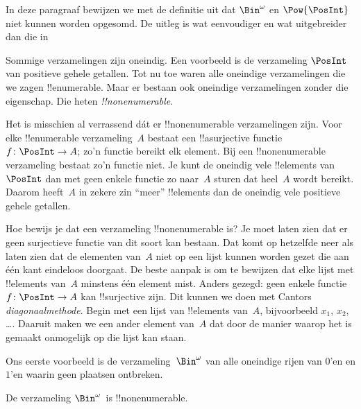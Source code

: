 \documentclass[../../../include/open-logic-section]{subfiles}
\begin{document}


\begin{editorial}
  In deze paragraaf bewijzen we met de definitie uit 
  dat $\Bin^\omega$ en $\Pow{\PosInt}$ niet kunnen worden opgesomd. De
  uitleg is wat eenvoudiger en wat uitgebreider dan die in
\end{editorial}

Sommige verzamelingen zijn oneindig. Een voorbeeld is de verzameling
$\PosInt$ van positieve gehele getallen. Tot nu toe waren alle
oneindige verzamelingen die we zagen !!{enumerable}. Maar er bestaan ook
oneindige verzamelingen zonder die eigenschap. Die heten
\emph{!!{nonenumerable}}.

Het is misschien al verrassend dát er !!{nonenumerable} verzamelingen
zijn. Voor elke !!{enumerable} verzameling~$A$ bestaat een
!!a{surjective} functie $f \colon \PosInt \to A$; zo'n functie bereikt
elk element. Bij een !!{nonenumerable} verzameling bestaat
zo'n functie niet. Je kunt de oneindig vele !!{element}s van~$\PosInt$
dan met geen enkele functie zo naar~$A$ sturen dat heel~$A$ wordt
bereikt. Daarom heeft~$A$ in zekere zin ``meer'' !!{element}s dan de
oneindig vele positieve gehele getallen.

Hoe bewijs je dat een verzameling !!{nonenumerable} is? Je moet laten
zien dat er geen surjectieve functie van dit soort kan bestaan. Dat
komt op hetzelfde neer als laten zien dat de elementen van~$A$ niet op
een lijst kunnen worden gezet die aan één kant eindeloos doorgaat. De beste
aanpak is om te bewijzen dat elke lijst met
!!{element}s van~$A$ minstens één element mist. Anders gezegd: geen
enkele functie $f\colon \PosInt \to A$ kan !!{surjective} zijn. Dit
kunnen we doen met Cantors \emph{diagonaalmethode}. Begin met een lijst
van !!{element}s van~$A$, bijvoorbeeld $x_1$, $x_2$, \dots. Daaruit
maken we een ander element van~$A$ dat door de manier waarop het is
gemaakt onmogelijk op die lijst kan staan.

Ons eerste voorbeeld is de verzameling~$\Bin^\omega$ van alle oneindige
rijen van $0$'en en $1$'en waarin geen plaatsen ontbreken.

\begin{thm}
De verzameling $\Bin^\omega$~is !!{nonenumerable}.
\end{thm}
\end{document}
